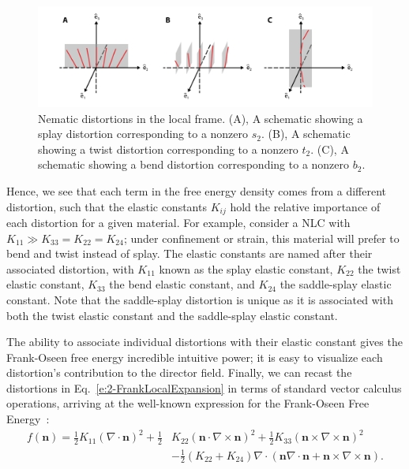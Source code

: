 \begin{figure}
  \centering
  \includegraphics{figures/C2/Ch2-Figs_FrankDist.png}
  \caption{Nematic distortions in the local frame. (A), A schematic showing a splay distortion corresponding to a nonzero $s_2$.
  (B), A schematic showing a twist distortion corresponding to a nonzero $t_2$.
  (C), A schematic showing a bend distortion corresponding to a nonzero $b_2$.}\label{f:2-FrankDist}
\end{figure}
Hence, we see that each term in the free energy density comes from a different distortion, such that the elastic constants $K_{ij}$ hold the relative importance of each distortion for a given material.
For example, consider a NLC with $K_{11} \gg K_{33} = K_{22} = K_{24}$; under confinement or strain, this material will prefer to bend and twist instead of splay.
The elastic constants are named after their associated distortion, with $K_{11}$ known as the splay elastic constant, $K_{22}$ the twist elastic constant, $K_{33}$ the bend elastic constant, and $K_{24}$ the saddle-splay elastic constant.
Note that the saddle-splay distortion is unique as it is associated with both the twist elastic constant and the saddle-splay elastic constant.

The ability to associate individual distortions with their elastic constant gives the Frank-Oseen free energy incredible intuitive power; it is easy to visualize each distortion's contribution to the director field.
Finally, we can recast the distortions in Eq.~\ref{e:2-FrankLocalExpansion} in terms of standard vector calculus operations, arriving at the well-known expression for the Frank-Oseen Free Energy~\cite{RN61}:
\begin{align}
  f(\mathbf{n}) = \frac{1}{2}K_{11} (\nabla \cdot \mathbf{n})^2 + \frac{1}{2}&K_{22} (\mathbf{n} \cdot \nabla \times \mathbf{n})^2 + \frac{1}{2}K_{33} (\mathbf{n} \times \nabla \times \mathbf{n})^2 \nonumber \\
    & - \frac{1}{2}(K_{22} + K_{24}) \nabla \cdot (\mathbf{n}\nabla \cdot \mathbf{n} + \mathbf{n} \times \nabla \times \mathbf{n}).\label{e:2-FrankFinalExpansion}
\end{align}

